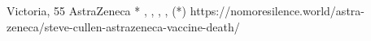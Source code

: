           {Victoria, }
          {55}
          {AstraZeneca}
          {*}
          {
            ,
            ,
            ,
            ,
             (*)
          }
          {https://nomoresilence.world/astra-zeneca/steve-cullen-astrazeneca-vaccine-death/}

